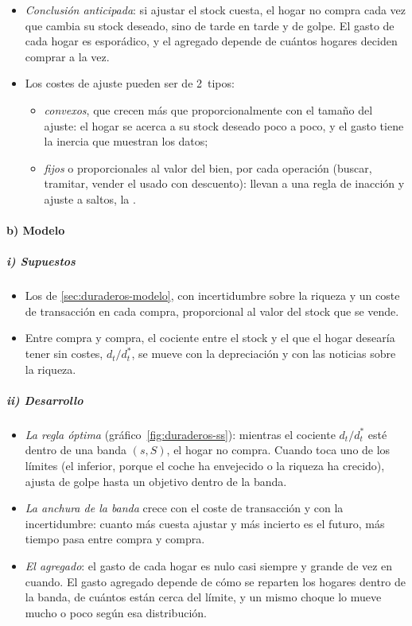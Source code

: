 \documentclass[11pt]{article}
\begin{document}
\begin{itemize}
\item \emph{Conclusión anticipada}: si ajustar el stock cuesta, el hogar no compra cada vez que cambia su stock deseado, sino de tarde en tarde y de golpe. El gasto de cada hogar es esporádico, y el agregado depende de cuántos hogares deciden comprar a la vez.
\item Los costes de ajuste pueden ser de 2~tipos:
  \begin{itemize}
  \item \emph{convexos}, que crecen más que proporcionalmente con el tamaño del ajuste: el hogar se acerca a su stock deseado poco a poco, y el gasto tiene la inercia que muestran los datos\nocite{Bernanke1985Adjustment};
  \item \emph{fijos} o proporcionales al valor del bien, por cada operación (buscar, tramitar, vender el usado con descuento): llevan a una regla de inacción y ajuste a saltos, la .
  \end{itemize}
\end{itemize}

\paragraph{b) Modelo}

\subparagraph{i) Supuestos}

\begin{itemize}
\item Los de \ref{sec:duraderos-modelo}, con incertidumbre sobre la riqueza y un coste de transacción en cada compra, proporcional al valor del stock que se vende\nocite{GrossmanLaroque1990Asset}.
\item Entre compra y compra, el cociente entre el stock y el que el hogar desearía tener sin costes, $d_t/d^*_t$, se mueve con la depreciación y con las noticias sobre la riqueza.
\end{itemize}

\subparagraph{ii) Desarrollo}

\begin{itemize}
\item \emph{La regla óptima} (gráfico~\ref{fig:duraderos-ss}): mientras el cociente $d_t/d^*_t$ esté dentro de una banda $(s,S)$, el hogar no compra. Cuando toca uno de los límites (el inferior, porque el coche ha envejecido o la riqueza ha crecido), ajusta de golpe hasta un objetivo dentro de la banda.
\item \emph{La anchura de la banda} crece con el coste de transacción y con la incertidumbre: cuanto más cuesta ajustar y más incierto es el futuro, más tiempo pasa entre compra y compra.
\item \emph{El agregado}: el gasto de cada hogar es nulo casi siempre y grande de vez en cuando. El gasto agregado depende de cómo se reparten los hogares dentro de la banda, de cuántos están cerca del límite, y un mismo choque lo mueve mucho o poco según esa distribución\nocite{BertolaCaballero1990Kinked}.
\end{itemize}
\end{document}
